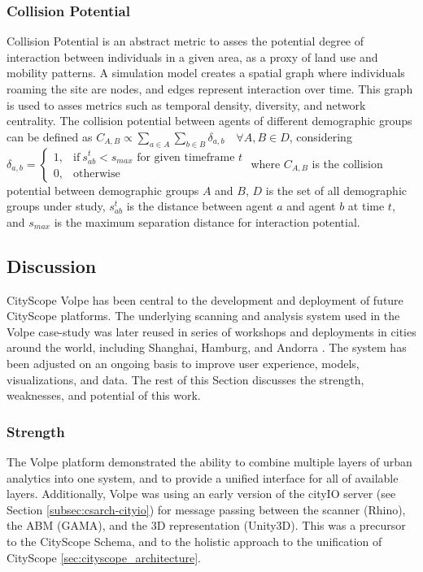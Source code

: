 {{        \subsubsection{Collision Potential}
        {
            Collision Potential is an abstract metric to asses the potential degree of interaction between individuals in a given area, as a proxy of land use and mobility patterns. A simulation model creates a spatial graph where individuals roaming the site are nodes, and edges represent interaction over time. This graph is used to asses metrics such as temporal density, diversity, and network centrality. The collision potential between agents of different demographic groups can be defined as $ C_{A,B} \propto \sum_{a \in A}\sum_{b \in B}\delta_{a,b} \quad \forall A, B \in D$, considering $\delta_{a,b} =
                \begin{cases}
                    1, & \text{if}\ s_{ab}^t < s_{max} \text{ for given timeframe }t \\
                    0, & \text{otherwise}
                \end{cases}$
            \newline
            where $C_{A,B}$ is the collision potential between demographic groups $A$ and $B$, $D$ is the set of all demographic groups under study, $s_{ab}^t$ is the distance between agent $a$ and agent $b$ at time $t$, and $s_{max}$ is the maximum separation distance for interaction potential.
        }
    }

    \subsection{Discussion}\label{volpe_discussion}
    {

        CityScope Volpe has been central to the development and deployment of future CityScope platforms. The underlying scanning and analysis system used in the Volpe case-study \cite{zhang2017citymatrix} was later reused in series of workshops and deployments in cities around the world, including Shanghai, Hamburg, and Andorra \cite{noyman2017finding}. The system has been adjusted on an ongoing basis to improve user experience, models, visualizations, and data. The rest of this Section discusses the strength, weaknesses, and potential of this work.

        \subsubsection{Strength}
        {
            The Volpe platform demonstrated the ability to combine multiple layers of urban analytics into one system, and to provide a unified interface for all of available layers. Additionally, Volpe was using an early version of the cityIO server (see Section \eqref{subsec:csarch-cityio}) for message passing between the scanner (Rhino), the ABM (GAMA), and the 3D representation (Unity3D). This was a precursor to the CityScope Schema, and to the holistic approach to the unification of CityScope \eqref{sec:cityscope_architecture}.
        }

}}
